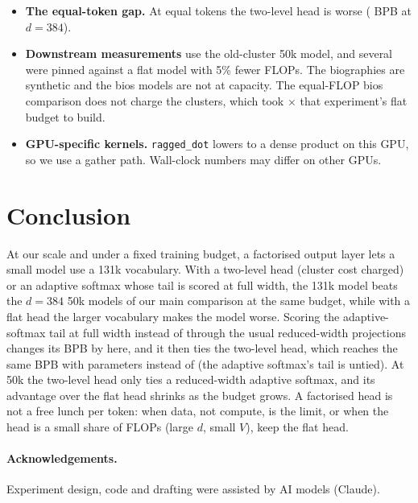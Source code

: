 \documentclass[11pt]{article}
\theoremstyle{remark}
\begin{document}
\begin{itemize}
  At ${\sim}600$M parameters with a 50k vocabulary it is \ShareShapeA{} ($d=1024$, 48 blocks), \ShareShapeB{} ($d=1280$, 30),
  \ShareShapeC{} ($d=1536$, 20) or \ShareShapeD{} ($d=2048$, 12), so the expected gain there is small. With a 131k vocabulary it
  is \ShareShapeBigA{}--\ShareShapeBigD{}.
  \item \textbf{The equal-token gap.} At equal tokens the two-level head is worse (\EqTokDelta{} BPB at $d=384$).
  \item \textbf{Downstream measurements} use the old-cluster 50k model, and several were pinned against a flat model with 5\%
  fewer FLOPs. The biographies are synthetic and the bios models are not at capacity. The equal-FLOP bios comparison does not
charge the clusters, which took \ClusterCostBios{}$\times$ that experiment's flat budget to build.
  \item \textbf{GPU-specific kernels.} \texttt{ragged\_dot} lowers to a dense product on this GPU, so we use a gather path.
  Wall-clock numbers may differ on other GPUs.
\end{itemize}

\section{Conclusion}
At our scale and under a fixed training budget, a factorised output layer lets a small model use a 131k vocabulary. With a
two-level head (cluster cost charged) or an adaptive softmax whose tail is scored at full width, the 131k model beats the $d=384$
50k models of our main comparison at the same budget, while with a flat head the larger vocabulary makes the model worse. Scoring the adaptive-softmax tail at
full width instead of through the usual reduced-width projections changes its BPB by \BigWidMean{} here, and it then ties the
two-level head, which reaches the same BPB with \ParamsTlBig{} parameters instead of \ParamsAsBigW{} (the adaptive softmax's tail is untied). At 50k the two-level head only ties a reduced-width adaptive
softmax, and its advantage over the flat head shrinks as the budget grows. A factorised head is not a free lunch per token: when
data, not compute, is the limit, or when the head is a small share of FLOPs (large $d$, small $V$), keep the flat head.

\paragraph{Acknowledgements.} Experiment design, code and drafting were assisted by AI models (Claude).
\end{document}
